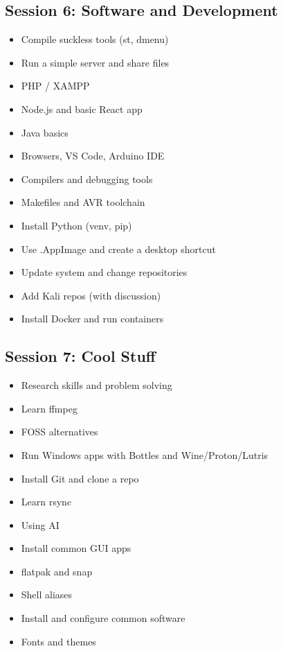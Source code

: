 \documentclass[12pt]{article}
\begin{document}
\subsection*{Session 6: Software and Development}
\begin{itemize}
    \item Compile suckless tools (st, dmenu)
    \item Run a simple server and share files
    \item PHP / XAMPP
    \item Node.js and basic React app
    \item Java basics
    \item Browsers, VS Code, Arduino IDE
    \item Compilers and debugging tools
    \item Makefiles and AVR toolchain
    \item Install Python (venv, pip)
    \item Use .AppImage and create a desktop shortcut
    \item Update system and change repositories
    \item Add Kali repos (with discussion)
    \item Install Docker and run containers
\end{itemize}

\subsection*{Session 7: Cool Stuff}
\begin{itemize}
    \item Research skills and problem solving
    \item Learn ffmpeg
    \item FOSS alternatives
    \item Run Windows apps with Bottles and Wine/Proton/Lutris
    \item Install Git and clone a repo
    \item Learn rsync
    \item Using AI
    \item Install common GUI apps
    \item flatpak and snap
    \item Shell aliases
    \item Install and configure common software
    \item Fonts and themes
\end{itemize}
\end{document}
